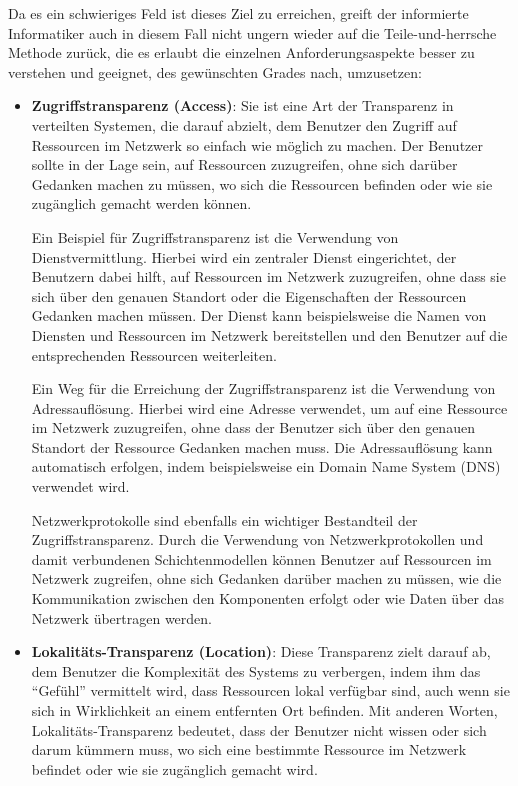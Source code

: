 \documentclass[../vs-script-first-v01.tex]{subfiles}
\begin{document}
Da es ein schwieriges Feld ist dieses Ziel zu erreichen, greift der informierte Informatiker auch in diesem Fall nicht ungern wieder auf die Teile-und-herrsche Methode zurück, die es erlaubt die einzelnen Anforderungsaspekte besser zu verstehen und geeignet, des gewünschten Grades nach, umzusetzen:
\begin{itemize}
\item  \textbf{Zugriffstransparenz (Access)}: Sie ist eine Art der Transparenz in verteilten Systemen, die darauf abzielt, dem Benutzer den Zugriff auf Ressourcen im Netzwerk so einfach wie möglich zu machen. Der Benutzer sollte in der Lage sein, auf Ressourcen zuzugreifen, ohne sich darüber Gedanken machen zu müssen, wo sich die Ressourcen befinden oder wie sie zugänglich gemacht werden können.

Ein Beispiel für Zugriffstransparenz ist die Verwendung von Dienstvermittlung. Hierbei wird ein zentraler Dienst eingerichtet, der Benutzern dabei hilft, auf Ressourcen im Netzwerk zuzugreifen, ohne dass sie sich über den genauen Standort oder die Eigenschaften der Ressourcen Gedanken machen müssen. Der Dienst kann beispielsweise die Namen von Diensten und Ressourcen im Netzwerk bereitstellen und den Benutzer auf die entsprechenden Ressourcen weiterleiten.

Ein Weg für die Erreichung der Zugriffstransparenz ist die Verwendung von Adressauflösung. Hierbei wird eine Adresse verwendet, um auf eine Ressource im Netzwerk zuzugreifen, ohne dass der Benutzer sich über den genauen Standort der Ressource Gedanken machen muss. Die Adressauflösung kann automatisch erfolgen, indem beispielsweise ein Domain Name System (DNS) verwendet wird.

Netzwerkprotokolle sind ebenfalls ein wichtiger Bestandteil der Zugriffstransparenz. Durch die Verwendung von Netzwerkprotokollen und damit verbundenen Schichtenmodellen können Benutzer auf Ressourcen im Netzwerk zugreifen, ohne sich Gedanken darüber machen zu müssen, wie die Kommunikation zwischen den Komponenten erfolgt oder wie Daten über das Netzwerk übertragen werden.

\item \textbf{Lokalitäts-Transparenz (Location)}: Diese Transparenz zielt darauf ab, dem Benutzer die Komplexität des Systems zu verbergen, indem ihm das \enquote{Gefühl} vermittelt wird, dass Ressourcen lokal verfügbar sind, auch wenn sie sich in Wirklichkeit an einem entfernten Ort befinden. Mit anderen Worten, Lokalitäts-Transparenz bedeutet, dass der Benutzer nicht wissen oder sich darum kümmern muss, wo sich eine bestimmte Ressource im Netzwerk befindet oder wie sie zugänglich gemacht wird.


\end{itemize}
\end{document}
